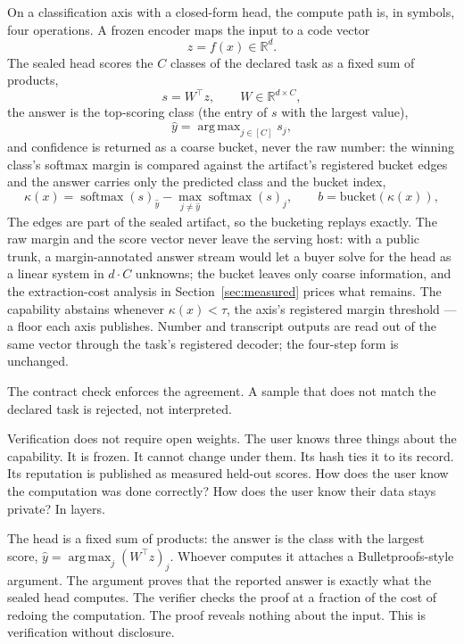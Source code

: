 \documentclass[11pt]{article}
\DeclareMathOperator{\argmax}{arg\,max}
\DeclareMathOperator{\softmax}{softmax}
\begin{document}
On a classification axis with a closed-form head, the compute
path is, in symbols, four operations. A frozen encoder maps the
input to a code vector
\begin{equation}
z = f(x) \in \mathbb{R}^d.
\end{equation}
The sealed head scores the $C$ classes of the declared task as a
fixed sum of products,
\begin{equation}
s = W^\top z, \qquad W \in \mathbb{R}^{d \times C},
\end{equation}
the answer is the top-scoring class (the entry of $s$ with the
largest value),
\begin{equation}
\hat y = \argmax_{j \in [C]} s_j,
\end{equation}
and confidence is returned as a coarse bucket, never the raw
number: the winning class's softmax margin is compared against
the artifact's registered bucket edges and the answer carries
only the predicted class and the bucket index,
\begin{equation}
\kappa(x) = \softmax(s)_{\hat y} - \max_{j \neq \hat y} \softmax(s)_j, \qquad
b = \text{bucket}(\kappa(x)),
\end{equation}
The edges are part of the sealed artifact, so the bucketing
replays exactly. The raw margin and the score vector never leave
the serving host: with a public trunk, a margin-annotated answer
stream would let a buyer solve for the head as a linear system
in $d \cdot C$ unknowns; the bucket leaves only coarse
information, and the extraction-cost analysis in
Section~\ref{sec:measured} prices what remains.
The capability abstains whenever $\kappa(x) < \tau$, the axis's
registered margin threshold --- a floor each axis publishes.
Number and transcript outputs are
read out of the same vector through the task's registered
decoder; the four-step form is unchanged.

The contract check enforces the agreement. A sample that does not
match the declared task is rejected, not interpreted.

Verification does not require open weights. The user knows three
things about the capability. It is frozen. It cannot change under
them. Its hash ties it to its record. Its reputation is published
as measured held-out scores. How does the user know the
computation was done correctly? How does the user know their data
stays private? In layers.

The head is a fixed sum of products: the answer is the class
with the largest score, $\hat y = \argmax_j (W^\top z)_j$.
Whoever computes it attaches
a Bulletproofs-style argument. The argument proves that the
reported answer is exactly what the sealed head computes. The
verifier checks the proof at a fraction of the cost of redoing the
computation. The proof reveals nothing about the input. This is
verification without disclosure.
\end{document}
